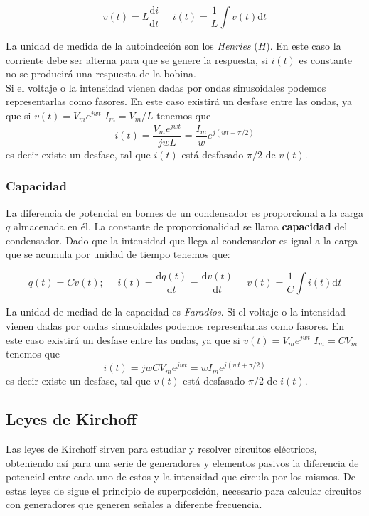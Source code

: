 \documentclass[12pt]{article}
\newcommand{\D}{\mathrm{d}}
\begin{document}
\begin{equation}
v(t) = L \dfrac{\D i}{\D t} \ \ \ \ \ \ i(t) = \dfrac{1}{L} \int v(t) \D t
\end{equation}

La unidad de medida de la autoindcción son los \textit{Henries} ($H$). En este caso la corriente debe ser alterna para que se genere la respuesta, si $i(t)$ es constante no se producirá una respuesta de la bobina.  \\

Si el voltaje o la intensidad vienen dadas por ondas sinusoidales podemos representarlas como fasores. En este caso existirá un desfase entre las ondas, ya que si $v(t) = V_m e^{jwt}$ $I_m = V_m/L$ tenemos que $$i(t) = \dfrac{V_m e^{jwt}}{jwL} = \dfrac{I_m}{w} e^{j(wt-\pi/2)}$$ es decir existe un desfase, tal que $i(t)$ está desfasado $\pi/2$ de $v(t)$. 


\subsubsection{Capacidad}

La diferencia de potencial en bornes de un condensador es proporcional a la carga $q$ almacenada en él. La constante de proporcionalidad se llama \textbf{capacidad} del condensador. Dado que la intensidad que llega al condensador es igual a la carga que se acumula por unidad de tiempo tenemos que:

\begin{equation}
q(t) = C v(t); \ \ \ \ \ \ i(t) = \dfrac{\D  q(t)}{\D t} = \dfrac{\D v(t)}{\D t} \ \ \ \ \ \ v(t) = \dfrac{1}{C} \int i(t) \D t
\end{equation}

La unidad de mediad de la capacidad es \textit{Faradios}. Si el voltaje o la intensidad vienen dadas por ondas sinusoidales podemos representarlas como fasores. En este caso existirá un desfase entre las ondas, ya que si $v(t) = V_m e^{jwt}$ $I_m =C V_m$ tenemos que $$i(t) = jwCV_m e^{jwt} = w I_m e^{j(wt+\pi/2)}$$ es decir existe un desfase, tal que $v(t)$ está desfasado $\pi/2$ de $i(t)$.  



\subsection{Leyes de Kirchoff}

Las leyes de Kirchoff sirven para estudiar y resolver circuitos eléctricos, obteniendo así para una serie de generadores y elementos pasivos la diferencia de potencial entre cada uno de estos y la intensidad que circula por los mismos. De estas leyes de sigue el principio de superposición, necesario para calcular circuitos con generadores que generen señales a diferente frecuencia.
\end{document}
